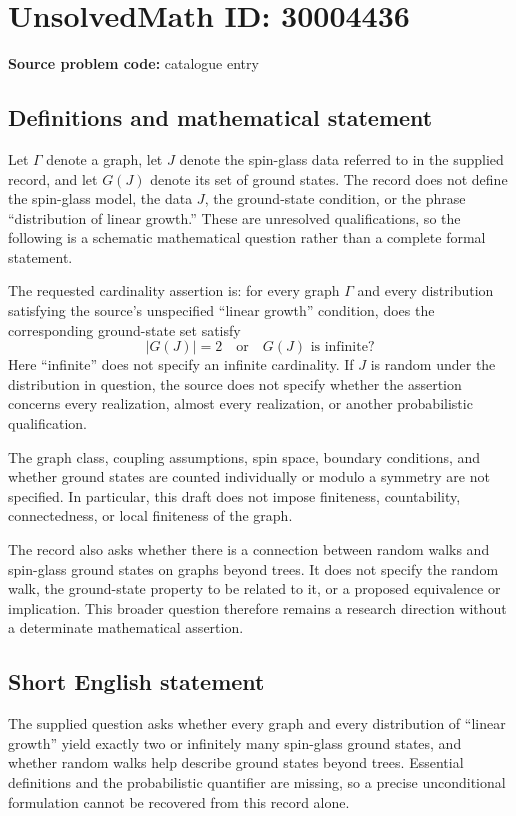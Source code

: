 \documentclass[11pt]{article}
\begin{document}
\section*{UnsolvedMath ID: 30004436}
\textbf{Source problem code:} catalogue entry
\subsection{Definitions and mathematical statement}
Let \(\Gamma\) denote a graph, let \(J\) denote the spin-glass data referred to in the supplied record, and let \(G(J)\) denote its set of ground states. The record does not define the spin-glass model, the data \(J\), the ground-state condition, or the phrase ``distribution of linear growth.'' These are unresolved qualifications, so the following is a schematic mathematical question rather than a complete formal statement.

The requested cardinality assertion is: for every graph \(\Gamma\) and every distribution satisfying the source's unspecified ``linear growth'' condition, does the corresponding ground-state set satisfy
\[
\lvert G(J)\rvert=2
\quad\text{or}\quad
G(J)\text{ is infinite}?
\]
Here ``infinite'' does not specify an infinite cardinality. If \(J\) is random under the distribution in question, the source does not specify whether the assertion concerns every realization, almost every realization, or another probabilistic qualification.

The graph class, coupling assumptions, spin space, boundary conditions, and whether ground states are counted individually or modulo a symmetry are not specified. In particular, this draft does not impose finiteness, countability, connectedness, or local finiteness of the graph.

The record also asks whether there is a connection between random walks and spin-glass ground states on graphs beyond trees. It does not specify the random walk, the ground-state property to be related to it, or a proposed equivalence or implication. This broader question therefore remains a research direction without a determinate mathematical assertion.
\subsection{Short English statement}
The supplied question asks whether every graph and every distribution of ``linear growth'' yield exactly two or infinitely many spin-glass ground states, and whether random walks help describe ground states beyond trees. Essential definitions and the probabilistic quantifier are missing, so a precise unconditional formulation cannot be recovered from this record alone.
\end{document}
